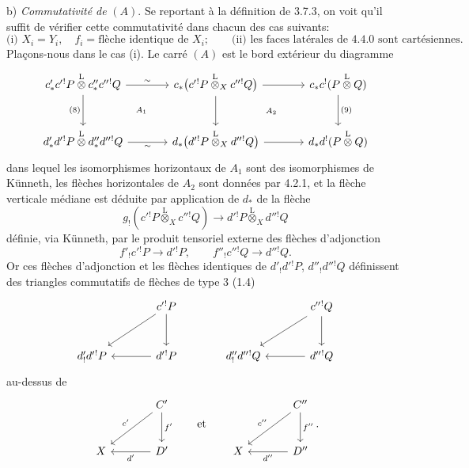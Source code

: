 \begin{prooftext}[Démonstration -]
b) \emph{Commutativité de} $(A)$. Se reportant à la définition de 3.7.3, on voit qu'il suffit de vérifier cette commutativité dans chacun des cas suivants:
\[
\text{(i) } X_i=Y_i,\quad f_i=\text{flèche identique de }X_i;\qquad
\text{(ii) les faces latérales de 4.4.0 sont cartésiennes.}
\]
Plaçons-nous dans le cas (i). Le carré $(A)$ est le bord extérieur du diagramme
\[
\begin{tikzcd}[column sep=large,row sep=large]
c'_*c'{}^!P\overset{\mathrm{L}}{\otimes}c''_*c''{}^!Q
 \arrow[r,"\sim"] \arrow[d,"(8)"'] &
c_*\bigl(c'{}^!P\overset{\mathrm{L}}{\otimes}_Xc''{}^!Q\bigr)
 \arrow[r] \arrow[d] &
c_*c^!(P\overset{\mathrm{L}}{\otimes} Q)\arrow[d,"(9)"]\\
d'_*d'{}^!P\overset{\mathrm{L}}{\otimes}d''_*d''{}^!Q
 \arrow[r,"\sim"'] &
d_*\bigl(d'{}^!P\overset{\mathrm{L}}{\otimes}_Xd''{}^!Q\bigr)
 \arrow[r] &
d_*d^!(P\overset{\mathrm{L}}{\otimes} Q)
\arrow[from=1-1,to=2-2, phantom, "\scriptstyle A_1"]
\arrow[from=1-2,to=2-3, phantom, "\scriptstyle A_2"]
\end{tikzcd}
\]
dans lequel les isomorphismes horizontaux de $A_1$ sont des isomorphismes de Künneth, les flèches horizontales de $A_2$ sont données par 4.2.1, et la flèche verticale médiane est déduite par application de $d_*$ de la flèche
\[
g_!(c'{}^!P\overset{\mathrm{L}}{\otimes}_Xc''{}^!Q)\longrightarrow d'{}^!P\overset{\mathrm{L}}{\otimes}_Xd''{}^!Q
\]
définie, via Künneth, par le produit tensoriel externe des flèches d'adjonction
\[
f'_!c'{}^!P\longrightarrow d'{}^!P,\qquad
f''_!c''{}^!Q\longrightarrow d''{}^!Q.
\]
Or ces flèches d'adjonction et les flèches identiques de $d'_!d'{}^!P$, $d''_!d''{}^!Q$ définissent des triangles commutatifs de flèches de type $3$ (1.4)
\[
\begin{tikzcd}[column sep=large,row sep=large]
& c'{}^!P \arrow[d] \arrow[dl] & & c''{}^!Q \arrow[d]\arrow[dl]\\
d'_!d'{}^!P & d'{}^!P\arrow[l] & d''_!d''{}^!Q & d''{}^!Q\arrow[l]
\end{tikzcd}
\]
au-dessus de
\[
\begin{tikzcd}[column sep=large,row sep=large]
& C' \arrow[d,"f'"] \arrow[dl,"c'"']\\
X & D'\arrow[l,"d'"]
\end{tikzcd}
\qquad\text{et}\qquad
\begin{tikzcd}[column sep=large,row sep=large]
& C'' \arrow[d,"f''"] \arrow[dl,"c''"']\\
X & D''\arrow[l,"d''"]
\end{tikzcd}.
\]
\end{prooftext}
